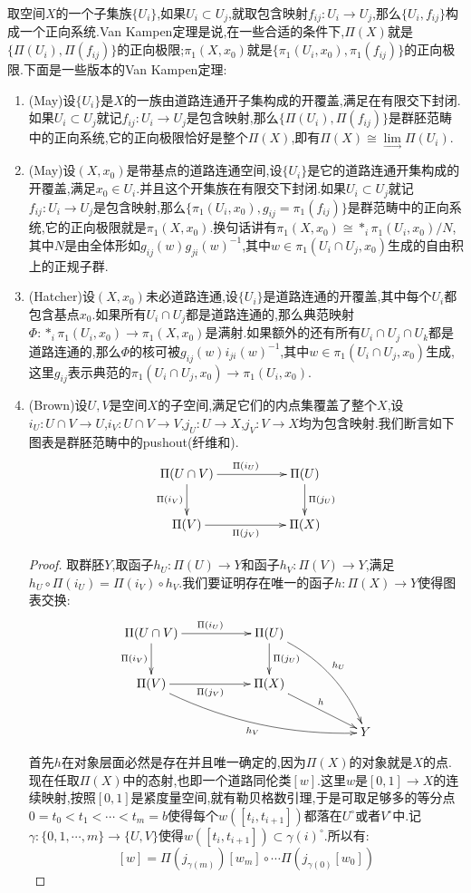 取空间$X$的一个子集族$\{U_i\}$,如果$U_i\subset U_j$,就取包含映射$f_{ij}:U_i\to U_j$,那么$\{U_i,f_{ij}\}$构成一个正向系统.Van Kampen定理是说,在一些合适的条件下,$\Pi(X)$就是$\{\Pi(U_i),\Pi(f_{ij})\}$的正向极限;$\pi_1(X,x_0)$就是$\{\pi_1(U_i,x_0),\pi_1(f_{ij})\}$的正向极限.下面是一些版本的Van Kampen定理:
\begin{enumerate}
	\item (May)设$\{U_i\}$是$X$的一族由道路连通开子集构成的开覆盖,满足在有限交下封闭.如果$U_i\subset U_j$就记$f_{ij}:U_i\to U_j$是包含映射,那么$\{\Pi(U_i),\Pi(f_{ij})\}$是群胚范畴中的正向系统,它的正向极限恰好是整个$\Pi(X)$,即有$\Pi(X)\cong\lim\limits_{\rightarrow}\Pi(U_i)$.
	\item (May)设$(X,x_0)$是带基点的道路连通空间,设$\{U_i\}$是它的道路连通开集构成的开覆盖,满足$x_0\in U_i$.并且这个开集族在有限交下封闭.如果$U_i\subset U_j$就记$f_{ij}:U_i\to U_j$是包含映射,那么$\{\pi_1(U_i,x_0),g_{ij}=\pi_1(f_{ij})\}$是群范畴中的正向系统,它的正向极限就是$\pi_1(X,x_0)$.换句话讲有$\pi_1(X,x_0)\cong\ast_i\pi_1(U_i,x_0)/N$,其中$N$是由全体形如$g_{ij}(w)g_{ji}(w)^{-1}$,其中$w\in\pi_1(U_i\cap U_j,x_0)$生成的自由积上的正规子群.
	\item (Hatcher)设$(X,x_0)$未必道路连通,设$\{U_i\}$是道路连通的开覆盖,其中每个$U_i$都包含基点$x_0$.如果所有$U_i\cap U_j$都是道路连通的,那么典范映射$\Phi:\ast_i\pi_1(U_i,x_0)\to\pi_1(X,x_0)$是满射.如果额外的还有所有$U_i\cap U_j\cap U_k$都是道路连通的,那么$\Phi$的核可被$g_{ij}(w)i_{ji}(w)^{-1}$,其中$w\in\pi_1(U_i\cap U_j,x_0)$生成,这里$g_{ij}$表示典范的$\pi_1(U_i\cap U_j,x_0)\to\pi_1(U_i,x_0)$.
	\item (Brown)设$U,V$是空间$X$的子空间,满足它们的内点集覆盖了整个$X$,设$i_U:U\cap V\to U$,$i_V:U\cap V\to V$,$j_U:U\to X$,$j_V:V\to X$均为包含映射.我们断言如下图表是群胚范畴中的pushout(纤维和).
	$$\xymatrix{\Pi(U\cap V)\ar[rr]^{\Pi(i_U)}\ar[d]_{\Pi(i_V)}&&\Pi(U)\ar[d]^{\Pi(j_U)}\\\Pi(V)\ar[rr]_{\Pi(j_V)}&&\Pi(X)}$$
	\begin{proof}
		
		取群胚$Y$,取函子$h_U:\Pi(U)\to Y$和函子$h_V:\Pi(V)\to Y$,满足$h_U\circ\Pi(i_U)=\Pi(i_V)\circ h_V$.我们要证明存在唯一的函子$h:\Pi(X)\to Y$使得图表交换:
		$$\xymatrix{\Pi(U\cap V)\ar[rr]^{\Pi(i_U)}\ar[d]_{\Pi(i_V)}&&\Pi(U)\ar[d]^{\Pi(j_U)}\ar@/^1pc/[ddrr]^{h_U}&&\\\Pi(V)\ar[rr]_{\Pi(j_V)}\ar@/_1pc/[drrrr]_{h_V}&&\Pi(X)\ar[drr]^h&&\\&&&&Y}$$
		
		首先$h$在对象层面必然是存在并且唯一确定的,因为$\Pi(X)$的对象就是$X$的点.现在任取$\Pi(X)$中的态射,也即一个道路同伦类$[w]$.这里$w$是$[0,1]\to X$的连续映射,按照$[0,1]$是紧度量空间,就有勒贝格数引理,于是可取足够多的等分点$0=t_0<t_1<\cdots<t_m=b$使得每个$w([t_i,t_{i+1}])$都落在$U^{\circ}$或者$V^{\circ}$中.记$\gamma:\{0,1,\cdots,m\}\to\{U,V\}$使得$w([t_i,t_{i+1}])\subset\gamma(i)^{\circ}$.所以有:
		$$[w]=\Pi(j_{\gamma(m)})[w_m]\circ\cdots\Pi(j_{\gamma(0)}[w_0])$$
		

\end{proof}
\end{enumerate}
